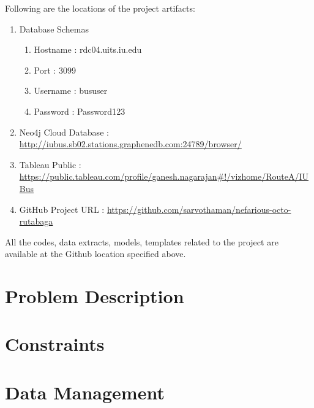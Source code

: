 \documentclass[12pt]{article}
\begin{document}
Following are the locations of the project artifacts:\\
\begin{enumerate}
\item Database Schemas
\begin{enumerate}
\item Hostname : rdc04.uits.iu.edu
\item Port : 3099
\item Username : bususer
\item Password : Password123
\end{enumerate}
\item Neo4j Cloud Database : \url{http://iubus.sb02.stations.graphenedb.com:24789/browser/}
\item Tableau Public : \url{https://public.tableau.com/profile/ganesh.nagarajan#!/vizhome/RouteA/IUBus}
\item GitHub Project URL : \url{https://github.com/sarvothaman/nefarious-octo-rutabaga}
\end{enumerate}
All the codes, data extracts, models, templates related to the project are available at the Github location specified above.

\clearpage

\section{Problem Description}
\section{Constraints}
\section{Data Management}
\end{document}
